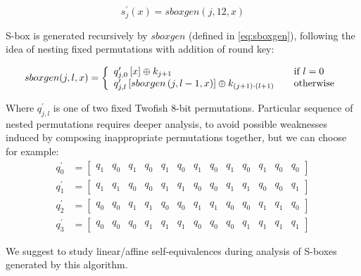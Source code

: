 \documentclass[11pt,oneside,final]{fithesis2}
\begin{document}
    \begin{equation}\label{eq:complex_sbox}
	s^{\prime}_{j}\left(x\right) = sboxgen(j,12,x)
    \end{equation}
    
    S-box is generated recursively by $sboxgen$ (defined in \ref{eq:sboxgen}), following the idea of nesting fixed permutations with addition of round key:
    
    \begin{equation}\label{eq:sboxgen}
	sboxgen(j,l,x) = \left\{ 
	\begin{array}{l l}  
	    q^{\prime}_{j,0}\left[ x \right]                          \oplus k_{j+1}		            & \quad \text{if $l=0$}\\
	    q^{\prime}_{j,l}\left[sboxgen\left(j, l-1,x\right)\right] \oplus k_{(j+1) \cdot (l+1)}          & \quad \text{otherwise}
	\end{array} \right.
    \end{equation}
    
    Where $q^{\prime}_{j,l}$ is one of two fixed Twofish 8-bit permutations. Particular sequence of nested permutations requires deeper analysis, to avoid possible weaknesses 
    induced by composing inappropriate permutations together, but we can choose for example:
    \setcounter{MaxMatrixCols}{13}
    \begin{subequations}
    \begin{align}
	q^{\prime}_{0} &= \begin{bmatrix}  q_1 & q_0 & q_1 & q_0 & q_1 & q_0 & q_1 & q_0 & q_1 & q_0 & q_1 & q_0 & q_0 \end{bmatrix}\\
	q^{\prime}_{1} &= \begin{bmatrix}  q_1 & q_1 & q_0 & q_0 & q_1 & q_1 & q_0 & q_0 & q_1 & q_1 & q_0 & q_0 & q_1 \end{bmatrix}\\
	q^{\prime}_{2} &= \begin{bmatrix}  q_0 & q_0 & q_1 & q_1 & q_0 & q_0 & q_1 & q_1 & q_0 & q_0 & q_1 & q_1 & q_0 \end{bmatrix}\\
	q^{\prime}_{3} &= \begin{bmatrix}  q_0 & q_0 & q_0 & q_1 & q_1 & q_1 & q_0 & q_0 & q_0 & q_1 & q_1 & q_1 & q_1 \end{bmatrix}
    \end{align}
    \end{subequations}

    We suggest to study linear/affine self-equivalences \citep{Biryukov:2003:TCL:1766171.1766175} during analysis of S-boxes generated by this algorithm.
\end{document}
